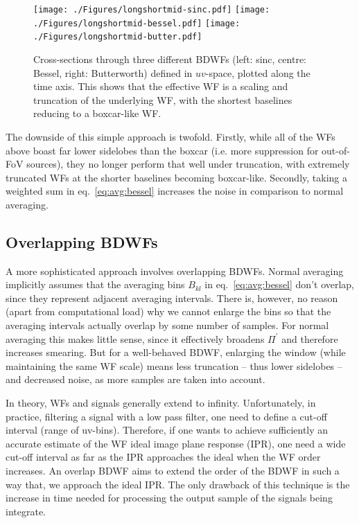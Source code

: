 \documentclass[useAMS,usenatbib]{mn2e}
\begin{document}
\begin{figure}%
\texttt{[image: ./Figures/longshortmid-sinc.pdf]}\hfill%
\texttt{[image: ./Figures/longshortmid-bessel.pdf]}\hfill%
\texttt{[image: ./Figures/longshortmid-butter.pdf]}
\caption{Cross-sections through three different BDWFs (left: sinc, centre: Bessel, right: Butterworth) defined in $uv$-space, 
plotted along the time axis. This shows that the effective WF is a scaling and truncation of the underlying WF, with
the shortest baselines reducing to a boxcar-like WF.}
\label{fig:WF:perbaseline}
\end{figure}

The downside of this simple approach is twofold. Firstly, while all of the WFs above boast far lower sidelobes than the boxcar
(i.e. more suppression for out-of-FoV sources), they no longer perform that well under truncation, with extremely truncated WFs 
at the shorter baselines becoming boxcar-like. Secondly, taking a weighted sum in eq.~\ref{eq:avg:bessel} increases 
the noise in comparison to normal averaging.

\subsection{Overlapping BDWFs}
\label{baseline2}

A more sophisticated approach involves overlapping BDWFs. Normal averaging implicitly assumes that the averaging bins $B_{kl}$ 
in eq.~\ref{eq:avg:bessel} don't overlap, since they represent adjacent averaging intervals. There is, however, no reason 
(apart from computational load) why we cannot enlarge the bins so that the averaging intervals actually overlap by 
some number of samples. For normal averaging this makes little sense, since it effectively broadens $\Pi^\prime$ and therefore
increases smearing. But for a well-behaved BDWF, enlarging the window (while maintaining the same WF scale) means 
less truncation -- thus lower sidelobes -- and decreased noise, as more samples are taken into account.



In theory, WFs and signals generally extend to  infinity. Unfortunately, in practice, filtering a signal with a low pass 
filter, one need to define a cut-off interval (range of uv-bins). Therefore, if one  wants to achieve sufficiently an accurate  estimate 
of the WF ideal image plane response (IPR), one need a wide cut-off interval as far as the IPR approaches 
the ideal when the WF order increases. An overlap BDWF aims to extend the order of the BDWF in 
such a way that, we approach the ideal IPR. The only drawback of this technique is the increase in time needed for processing the 
output sample of the signals being integrate.
\end{document}
